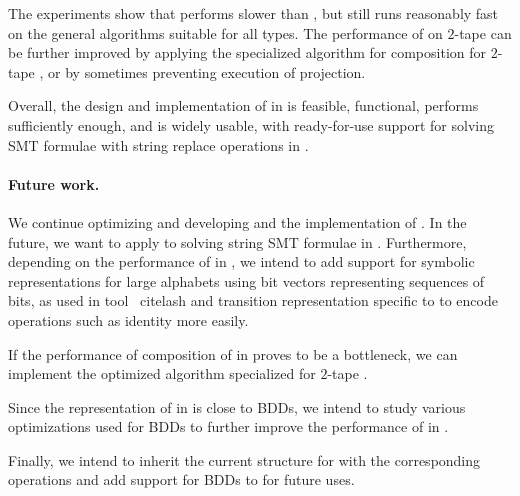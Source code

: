The experiments show that \mata performs slower than \mona, but still runs reasonably fast on the general algorithms suitable for all \nft types.
The performance of \mata on $2$-tape \nfts can be further improved by applying the specialized algorithm for composition for $2$-tape \nfts, or by sometimes preventing execution of projection.

Overall, the design and implementation of \nfts in \mata is feasible, functional, performs sufficiently enough, and is widely usable, with ready-for-use support for solving SMT formulae with string replace operations in \noodler.

\paragraph{Future work.}
We continue optimizing and developing \mata and the implementation of \nfts.
In the future, we want to apply \nfts to solving string SMT formulae in \noodler.
Furthermore, depending on the performance of \nfts in \noodler, we intend to add support for symbolic representations for large alphabets using bit vectors representing sequences of bits, as used in tool \lash~cite{lash} and transition representation specific to \nfts to encode \nft operations such as identity more easily.

If the performance of composition of \nfts in \noodler proves to be a bottleneck, we can implement the optimized algorithm specialized for $2$-tape \nfts.

Since the representation of \nfts in \mata is close to BDDs, we intend to study various optimizations used for BDDs to further improve the performance of \nfts in \mata.

Finally, we intend to inherit the current structure for \nfts with the corresponding operations and add support for BDDs to \mata for future uses.



% 
